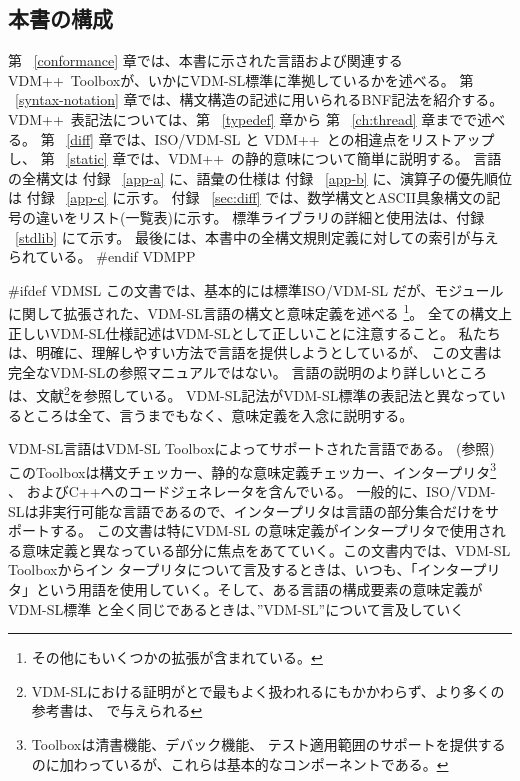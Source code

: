 \documentclass[\pformat,12pt]{jarticle}
\newcommand{\vdmsl}{VDM-SL}
\newcommand{\vdmpp}{VDM++}
\begin{document}
\subsection{本書の構成}

第 ~\ref{conformance} 章では、本書に示された言語および関連する \vdmpp\ Toolboxが、いかにVDM-SL標準に準拠しているかを述べる。
第 ~\ref{syntax-notation} 章では、構文構造の記述に用いられるBNF記法を紹介する。
 \vdmpp\ 表記法については、第 ~\ref{typedef} 章から 第 ~\ref{ch:thread} 章までで述べる。
第 ~\ref{diff} 章では、ISO/VDM-SL と  \vdmpp\ との相違点をリストアップし、
第 ~\ref{static} 章では、\vdmpp\ の静的意味について簡単に説明する。
言語の全構文は 付録 ~\ref{app-a} に、語彙の仕様は 付録 ~\ref{app-b} に、演算子の優先順位は 付録 ~\ref{app-c} に示す。
付録 ~\ref{sec:diff} では、数学構文とASCII具象構文の記号の違いをリスト(一覧表)に示す。
標準ライブラリの詳細と使用法は、付録 ~\ref{stdlib} にて示す。
最後には、本書中の全構文規則定義に対しての索引が与えられている。
#endif VDMPP

#ifdef VDMSL
この文書では、基本的には標準ISO/VDM-SL \cite{ISOVDM96}だが、モジュールに関して拡張された、VDM-SL言語の構文と意味定義を述べる
\footnote{その他にもいくつかの拡張が含まれている。}。
全ての構文上正しい{\vdmsl}仕様記述は{\vdmsl}として正しいことに注意すること。
私たちは、明確に、理解しやすい方法で言語を提供しようとしているが、
この文書は完全な{\vdmsl}の参照マニュアルではない。
言語の説明のより詳しいところは、文献\footnote{VDM-SLにおける証明が\cite{Jones90a}と\cite{Bicarregui&94}で最もよく扱われるにもかかわらず、より多くの参考書は、
\cite{Fitzgerald&98}で与えられる}を参照している。
VDM-SL記法がVDM-SL標準の表記法と異なっているところは全て、言うまでもなく、意味定義を入念に説明する。

VDM-SL言語はVDM-SL Toolboxによってサポートされた言語である。
(\cite{UserMan-SCSK}参照)
このToolboxは構文チェッカー、静的な意味定義チェッカー、インタープリタ\footnote{Toolboxは清書機能、デバック機能、
テスト適用範囲のサポートを提供するのに加わっているが、これらは基本的なコンポーネントである。} 、
およびC++へのコードジェネレータを含んでいる。
一般的に、ISO/VDM-SLは非実行可能な言語であるので、インタープリタは言語の部分集合だけをサポートする。
この文書は特にVDM-SL の意味定義がインタープリタで使用され
る意味定義と異なっている部分に焦点をあてていく。この文書内では、VDM-SL Toolboxからイン
タープリタについて言及するときは、いつも、「インタープリ
タ」という用語を使用していく。そして、ある言語の構成要素の意味定義がVDM-SL標準
と全く同じであるときは、”VDM-SL”について言及していく
\end{document}
